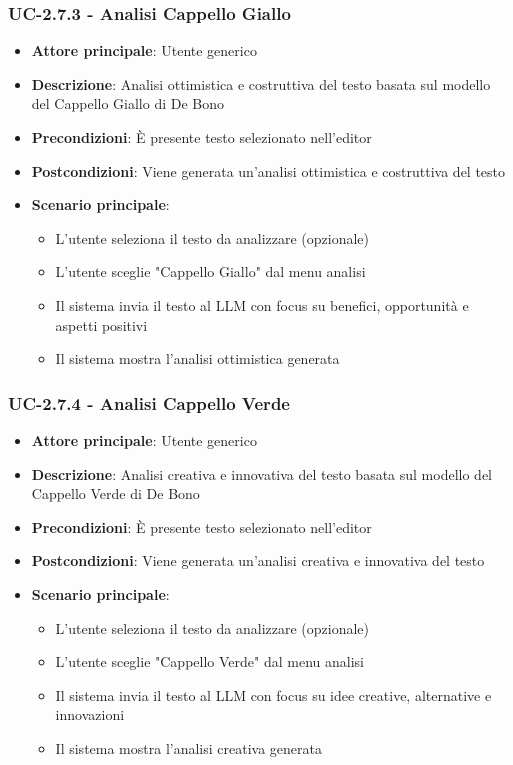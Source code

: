 \documentclass[11pt,a4paper]{article}
\begin{document}
\subsubsection{UC-2.7.3 - Analisi Cappello Giallo}
\begin{itemize}
    \item \textbf{Attore principale}: Utente generico
    \item \textbf{Descrizione}: Analisi ottimistica e costruttiva del testo basata sul modello del Cappello Giallo di De Bono
    \item \textbf{Precondizioni}: È presente testo selezionato nell'editor
    \item \textbf{Postcondizioni}: Viene generata un'analisi ottimistica e costruttiva del testo
    \item \textbf{Scenario principale}:
        \begin{itemize}
            \item L'utente seleziona il testo da analizzare (opzionale)
            \item L'utente sceglie "Cappello Giallo" dal menu analisi
            \item Il sistema invia il testo al LLM con focus su benefici, opportunità e aspetti positivi
            \item Il sistema mostra l'analisi ottimistica generata
        \end{itemize}
\end{itemize}

\subsubsection{UC-2.7.4 - Analisi Cappello Verde}
\begin{itemize}
    \item \textbf{Attore principale}: Utente generico
    \item \textbf{Descrizione}: Analisi creativa e innovativa del testo basata sul modello del Cappello Verde di De Bono
    \item \textbf{Precondizioni}: È presente testo selezionato nell'editor
    \item \textbf{Postcondizioni}: Viene generata un'analisi creativa e innovativa del testo
    \item \textbf{Scenario principale}:
        \begin{itemize}
            \item L'utente seleziona il testo da analizzare (opzionale)
            \item L'utente sceglie "Cappello Verde" dal menu analisi
            \item Il sistema invia il testo al LLM con focus su idee creative, alternative e innovazioni
            \item Il sistema mostra l'analisi creativa generata
        \end{itemize}
\end{itemize}
\end{document}
